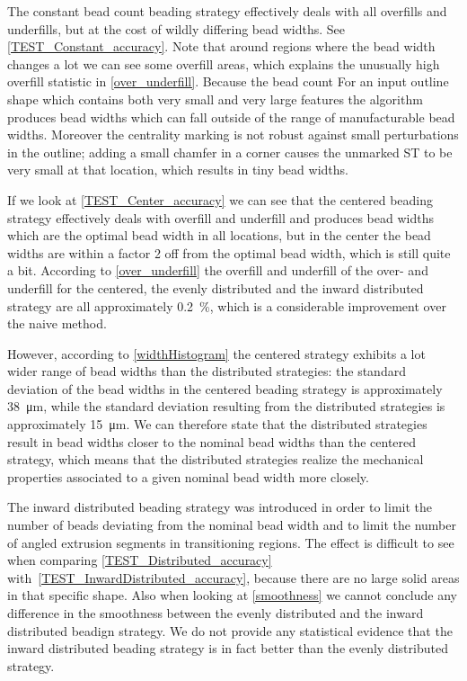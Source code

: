
The constant bead count beading strategy effectively deals with all overfills and underfills, but at the cost of wildly differing bead widths.
See \cref{TEST_Constant_accuracy}.
Note that around regions where the bead width changes a lot we can see some overfill areas, which explains the unusually high overfill statistic in \cref{over_underfill}.
Because the bead count 
For an input outline shape which contains both very small and very large features the algorithm produces bead widths which can fall outside of the range of manufacturable bead widths.
Moreover the centrality marking is not robust against small perturbations in the outline; adding a small chamfer in a corner causes the unmarked ST to be very small at that location, which results in tiny bead widths.

If we look at \cref{TEST_Center_accuracy} we can see that
the centered beading strategy effectively deals with overfill and underfill and produces bead widths which are the optimal bead width in all locations, but in the center the bead widths are within a factor 2 off from the optimal bead width, which is still quite a bit.
According to \cref{over_underfill} the overfill and underfill of the over- and underfill for the centered, the evenly distributed and the inward distributed strategy are all approximately \SI{0.2}{\percent}, which is a considerable improvement over the naive method.

However, according to \cref{widthHistogram} the centered strategy exhibits a lot wider range of bead widths than the distributed strategies:
the standard deviation of the bead widths in the centered beading strategy is approximately \SI{38}{\micro\meter}, while the standard deviation resulting from the distributed strategies is approximately \SI{15}{\micro\meter}.
We can therefore state that the distributed strategies result in bead widths closer to the nominal bead widths than the centered strategy, which means that the distributed strategies realize the mechanical properties associated to a given nominal bead width more closely.

The inward distributed beading strategy was introduced in order to limit the number of beads deviating from the nominal bead width and to limit the number of angled extrusion segments in transitioning regions.
The effect is difficult to see when comparing \cref{TEST_Distributed_accuracy} with~\ref{TEST_InwardDistributed_accuracy}, because there are no large solid areas in that specific shape.
Also when looking at \cref{smoothness} we cannot conclude any difference in the smoothness between the evenly distributed and the inward distributed beadign strategy.
We do not provide any statistical evidence that the inward distributed beading strategy is in fact better than the evenly distributed strategy.

